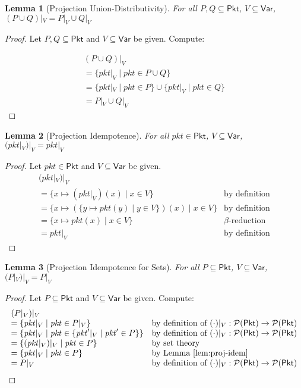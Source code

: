 \documentclass{article}
\newcommand{\pkt}{\mathit{pkt}}
\newcommand{\Pkt}{\mathsf{Pkt}}
\newcommand{\Var}{\mathsf{Var}}
\newtheorem{lemma}{Lemma}
\begin{document}
\begin{lemma}[Projection Union-Distributivity]
  \label{lem:proj-union-set}
  For all $P,Q \subseteq \Pkt$, $V \subseteq \Var$,
  $(P\cup Q)|_V = P|_V \cup Q|_V$
\end{lemma}

\begin{proof}
  Let $P,Q \subseteq \Pkt$ and $V \subseteq \Var$ be given. Compute:

  \[\begin{array}{ll}
  (P\cup Q)|_V\\
  = \{\pkt|_V \mid \pkt \in P\cup Q\}\\
  = \{\pkt|_V \mid \pkt \in P\}\cup \{\pkt|_V \mid \pkt \in Q\}\\
  = P|_V \cup Q|_V
  \end{array}\]
\end{proof}

\begin{lemma}[Projection Idempotence]
  \label{lem:proj-idem}
  For all $\pkt \in \Pkt$, $V \subseteq \Var$,
  $(\pkt|_V)|_V = \pkt|_V$
\end{lemma}

\begin{proof}
  Let $\pkt \in \Pkt$ and $V \subseteq \Var$ be given.
  \[\begin{array}{ll}
    (\pkt|_V)|_V \\
    = \{x \mapsto (\pkt|_V)(x) \mid x \in V\} & \text{by definition}\\
    = \{x \mapsto (\{y \mapsto \pkt(y) \mid y \in V\})(x) \mid x \in V\} & \text{by definition}\\
    = \{x \mapsto \pkt(x) \mid x \in V\} & \beta\text{-reduction}\\
    = \pkt|_V & \text{by definition}
  \end{array}\]
\end{proof}


\begin{lemma}[Projection Idempotence for Sets]
  \label{lem:proj-idem-set}
  For all $P \subseteq \Pkt$, $V \subseteq \Var$,
  $(P|_V)|_V = P|_V$
\end{lemma}

\begin{proof}
  Let $P \subseteq \Pkt$ and $V \subseteq \Var$ be given. Compute:
  \[\begin{array}{ll}
  (P|_V)|_V \\
  = \{\pkt|_V \mid \pkt \in P|_V\}
  & \text{by definition of } (\cdot)|_V : \mathcal{P}(\Pkt) \to \mathcal{P}(\Pkt) \\
  = \{\pkt|_V \mid \pkt \in \{\pkt'|_V \mid \pkt'\in P\}\}
  & \text{by definition of } (\cdot)|_V : \mathcal{P}(\Pkt) \to \mathcal{P}(\Pkt) \\
  = \{(\pkt|_V)|_V \mid \pkt \in P \}
  & \text{by set theory} \\
  = \{\pkt|_V \mid \pkt \in P\} & \text{by Lemma~\ref{lem:proj-idem}} \\
  = P|_V & \text{by definition of } (\cdot)|_V : \mathcal{P}(\Pkt) \to \mathcal{P}(\Pkt)
  \end{array}\]
\end{proof}
\end{document}
